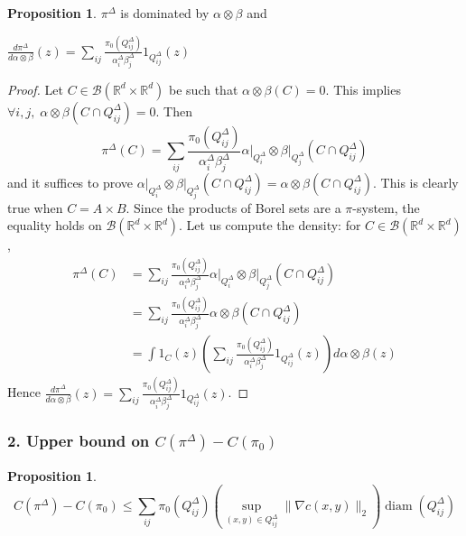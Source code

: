 \documentclass[12pt]{report}
\theoremstyle{definition}
\newtheorem{prop}[defi]{Proposition}
\theoremstyle{remark}
\DeclareMathOperator*{\diam}{diam}
\begin{document}
\begin{prop}
	$\pi^{\Delta}$ is dominated by $\alpha\otimes \beta$ and 
	\begin{center}
		$\displaystyle \frac{d\pi^\Delta}{d\alpha \otimes\beta}(z)=  \sum_{ij} \frac{\pi_0(Q_{ij}^\Delta)}{\alpha_i^\Delta\beta_j^\Delta} 1_{Q_{ij}^\Delta}(z)$
	\end{center}
\end{prop}

\begin{proof}
	Let $C\in \mathcal B(\mathbb R^d\times \mathbb R^d)$ be such that $\alpha \otimes \beta(C)=0$. This implies $\forall i,j, \;\alpha \otimes \beta(C\cap Q_{ij}^\Delta) = 0$. Then 
$$\pi^\Delta(C)= \sum_{ij} \frac{\pi_0(Q_{ij}^\Delta)}{\alpha_i^\Delta\beta_j^\Delta} \left.\alpha\right|_{Q_{i}^\Delta} \otimes \left.\beta\right|_{Q_{j}^\Delta}(C\cap Q_{ij}^\Delta)$$
and it suffices to prove  $\left.\alpha\right|_{Q_{i}^\Delta} \otimes \left.\beta\right|_{Q_{j}^\Delta}(C\cap Q_{ij}^\Delta) = \alpha \otimes \beta(C\cap Q_{ij}^\Delta)$. This is clearly true when $C=A\times B$. Since the products of Borel sets are a $\pi$-system, the equality holds on $\mathcal B(\mathbb R^d\times \mathbb R^d)$. Let us compute the density: for $C\in \mathcal B(\mathbb R^d\times \mathbb R^d)$, 
$$\begin{aligned}
	\pi^\Delta(C) 
	&= \sum_{ij} \frac{\pi_0(Q_{ij}^\Delta)}{\alpha_i^\Delta\beta_j^\Delta} \left.\alpha\right|_{Q_{i}^\Delta} \otimes \left.\beta\right|_{Q_{j}^\Delta}(C\cap Q_{ij}^\Delta) \\
	&= \sum_{ij} \frac{\pi_0(Q_{ij}^\Delta)}{\alpha_i^\Delta\beta_j^\Delta} \alpha \otimes\beta(C\cap Q_{ij}^\Delta) \\
	&= \int 1_C(z) \left(\sum_{ij} \frac{\pi_0(Q_{ij}^\Delta)}{\alpha_i^\Delta\beta_j^\Delta} 1_{Q_{ij}^\Delta}(z)\right) d\alpha \otimes\beta(z)
\end{aligned}$$
Hence $\displaystyle \frac{d\pi^\Delta}{d\alpha \otimes\beta}(z)=  \sum_{ij} \frac{\pi_0(Q_{ij}^\Delta)}{\alpha_i^\Delta\beta_j^\Delta} 1_{Q_{ij}^\Delta}(z)$.
\end{proof}



\subsubsection*{2. Upper bound on $C(\pi^{\Delta})-C(\pi_{0})$}

\begin{prop}\label{prop1}
	$$C(\pi^{\Delta})-C(\pi_{0})\leq \sum_{ij} \pi_0(Q_{ij}^{\Delta}) \left(\sup_{(x,y)\in Q_{ij}^\Delta} \|\nabla c(x,y)\|_2\right)\diam(Q_{ij}^{\Delta})$$
\end{prop}
\end{document}
